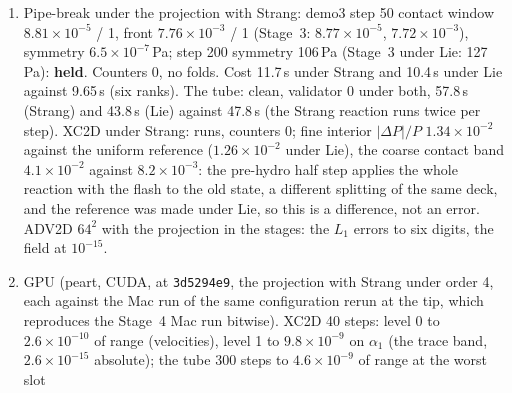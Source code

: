 \documentclass[11pt,a4paper]{article}
\newcommand{\code}[1]{\texttt{\small #1}}
\begin{document}
\begin{enumerate}[nosep]
      findings on the way.  (a) The B12 mirror check fails under mode 5
      ($1.7\times10^{5}$ and $6.3\times10^{5}$\,Pa), and that is mode 5
      itself, not this stage: at mode 5 with nothing of Stage~4 on the
      asymmetry is $7.5\times10^{5}$\,Pa, under the single-step order-2
      scheme at mode 5 $5.8\times10^{5}$\,Pa, under mode 6 (the code
      default, which the gate uses) $3.8\times10^{-5}$\,Pa.  Mode 5 is
      the control closure, not the default, and the gate's own run is at
      mode 6; recorded as a finding on mode 5.  (b) Strang without the
      stage projection breaks the B12 mirror at mode 6 by
      $6.2\times10^{3}$\,Pa ($10^{-3}$ of $P$); with the projection
      $1.1\times10^{-2}$\,Pa, Lie with the projection
      $3.9\times10^{-2}$\,Pa: the projection is what makes the Strang
      step mirror-symmetric.  The frozen-B5 failure under the probe is
      an artefact of forcing mode 5 onto the frozen check.
\item Pipe-break under the projection with Strang: demo3 step 50 contact
      window $8.81\times10^{-5}$ / 1, front $7.76\times10^{-3}$ / 1
      (Stage~3: $8.77\times10^{-5}$, $7.72\times10^{-3}$), symmetry
      $6.5\times10^{-7}$\,Pa; step 200 symmetry 106\,Pa (Stage~3 under
      Lie: 127\,Pa): \textbf{held}.  Counters 0, no folds.  Cost 11.7\,s
      under Strang and 10.4\,s under Lie against 9.65\,s (six ranks).
      The tube: clean, validator 0 under both, 57.8\,s (Strang) and
      43.8\,s (Lie) against 47.8\,s (the Strang reaction runs twice per
      step).  XC2D under Strang: runs, counters 0; fine interior
      $|\Delta P|/P$ $1.34\times10^{-2}$ against the uniform reference
      ($1.26\times10^{-2}$ under Lie), the coarse contact band
      $4.1\times10^{-2}$ against $8.2\times10^{-3}$: the pre-hydro half
      step applies the whole reaction with the flash to the old state, a
      different splitting of the same deck, and the reference was made
      under Lie, so this is a difference, not an error.  ADV2D $64^2$
      with the projection in the stages: the $L_1$ errors to six digits,
      the field at $10^{-15}$.
\item GPU (peart, CUDA, at \code{3d5294e9}, the projection with
      Strang under order 4, each against the Mac run of the same
      configuration rerun at the tip, which reproduces the Stage~4 Mac
      run bitwise).  XC2D 40 steps: level 0 to $2.6\times10^{-10}$ of
      range (velocities), level 1 to $9.8\times10^{-9}$ on $\alpha_1$
      (the trace band, $2.6\times10^{-15}$ absolute); the tube 300
      steps to $4.6\times10^{-9}$ of range at the worst slot

\end{enumerate}
\end{document}
